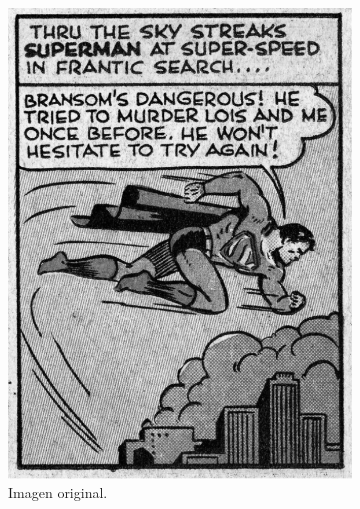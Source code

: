 \documentclass[letterpaper,12pt]{article}
\theoremstyle{plain}
\begin{document}
\begin{figure}[h]
    \centering
         \begin{subfigure}[h]{0.49\linewidth}
            \centering
            \includegraphics[width=\textwidth]{Figuras/superman.png}
            \caption{Imagen original.} 
         \end{subfigure}
         \begin{subfigure}[h]{0.49\linewidth}
            \centering

\end{subfigure}
\end{figure}
\end{document}
